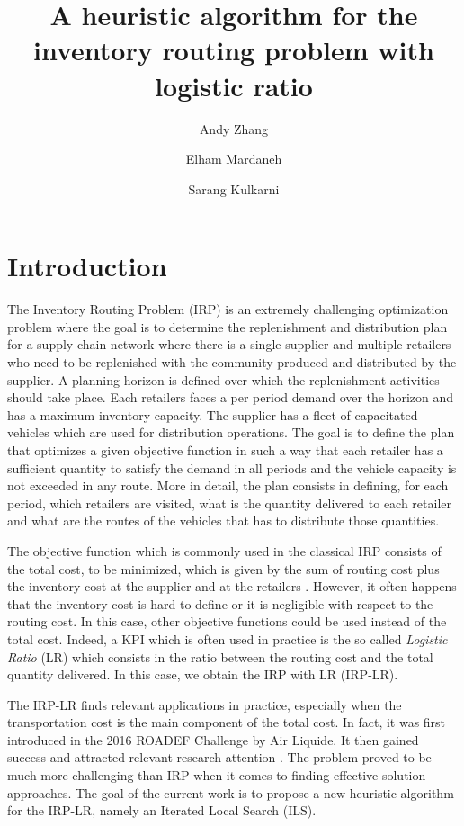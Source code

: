 \documentclass{article}
\title{A heuristic algorithm for the inventory routing problem with logistic ratio}
\author[2]{Andy Zhang}
\author[2]{Elham Mardaneh}
\author[2]{Sarang Kulkarni}
\affil[1]{\small Department of Economics and Management, University of Brescia, Brescia (Italy)}
\affil[2]{\small Faculty of Science and Engineering,
Curtin University, Perth (Australia)}
\date{}
\begin{document}
\maketitle


\section*{Introduction}

The Inventory Routing Problem (IRP) is an extremely challenging optimization problem where the goal is to determine the replenishment and distribution plan for a supply chain network where there is a single supplier and multiple retailers who need to be replenished with the community produced and distributed by the supplier. A planning horizon is defined over which the replenishment activities should take place. Each retailers faces a per period demand over the horizon and has a maximum inventory capacity. The supplier has a fleet of capacitated vehicles which are used for distribution operations. The goal is to define the plan that optimizes a given objective function in such a way that each retailer has a sufficient quantity to satisfy the demand in all periods and the vehicle capacity is not exceeded in any route. More in detail, the plan consists in defining, for each period, which retailers are visited, what is the quantity delivered to each retailer and what are the routes of the vehicles that has to distribute those quantities. 

The objective function which is commonly used in the classical IRP consists of the total cost, to be minimized, which is given by the sum of routing cost plus the inventory cost at the supplier and at the retailers \cite{archetti2012hybrid,archetti2016inventory}. However, it often happens that the inventory cost is hard to define or it is negligible with respect to the routing cost. In this case, other objective functions could be used instead of the total cost. Indeed, a KPI which is often used in practice is the so called \textit{Logistic Ratio} (LR) which consists in the ratio between the routing cost and the total quantity delivered. In this case, we obtain the IRP with LR (IRP-LR). 

The IRP-LR finds relevant applications in practice, especially when the transportation cost is the main component of the total cost. In fact, it was first introduced in the 2016 ROADEF Challenge by Air Liquide. It then gained success and attracted relevant research attention \cite{archetti2017minimizing,archetti2019exact,alvarez2018iterated}. The problem proved to be much more challenging than IRP when it comes to finding effective solution approaches. The goal of the current work is to propose a new heuristic algorithm for the IRP-LR, namely an Iterated Local Search (ILS).
\end{document}
